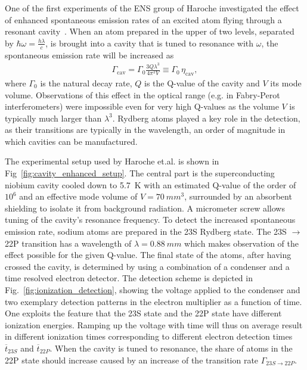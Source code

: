 One of the first experiments of the ENS group of Haroche investigated the effect
of enhanced spontaneous emission rates of an excited atom flying through a
resonant cavity~\cite{haroche1983EnhancedSpontEm}. When an atom prepared in
the upper of two levels, separated by $\hbar \omega=\frac{h\lambda}{c}$, is brought into a cavity
that is tuned to resonance with $\omega$, the spontaneous emission rate will
be increased as
\begin{align}
  \label{eq:enh_spont_em_rate}
  \Gamma_{\text{cav}} = \Gamma_0 \frac{3Q\lambda^3}{4\pi^2 V} \equiv
  \Gamma_0\,\eta_{\text{cav}},
\end{align}
where $\Gamma_0$ is the natural decay rate, $Q$ is the Q-value of the cavity and
$V$ its mode volume. Observations of this effect in the optical range (e.g. in
Fabry-Perot interferometers) were impossible even for very high Q-values as the
volume $V$ is typically much larger than $\lambda^3$. Rydberg atoms played a key
role in the detection, as their transitions are typically in the 
wavelength, an order of magnitude in which cavities can be manufactured.

The experimental setup used by Haroche et.al. is shown in
Fig~\ref{fig:cavity_enhanced_setup}. The central part is the superconducting
niobium cavity cooled down to \SI{5.7}{K} with an estimated Q-value of the order
of $10^6$ and an effective mode volume of $V=\SI{70}{mm^3}$, surrounded by an absorbent
shielding to isolate it from background radiation. A micrometer screw allows
tuning of the cavity's resonance frequency. To detect the increased spontaneous
emission rate, sodium atoms are prepared in the 23S Rydberg state. The
23S $\rightarrow$ 22P transition has a wavelength of $\lambda=\SI{0.88}{mm}$
which makes observation of the effect possible for the given Q-value. The final
state of the atoms, after having crossed the cavity, is determined by using a
combination of a condenser and a time resolved electron detector. The detection
scheme is depicted in Fig.~\ref{fig:ionization_detection}, showing the voltage
applied to the condenser and two exemplary detection patterns in the electron
multiplier as a function of time. One exploits the feature that the 23S state
and the 22P state have different ionization energies. Ramping up the voltage
with time will thus on average result in different ionization times
corresponding to different electron detection times $\overline{t}_{23S}$ and
$\overline{t}_{22P}$. When the cavity is tuned to resonance, the share of atoms
in the 22P state should increase caused by an increase of the transition rate
$\Gamma_{23S \rightarrow 22P}$.

